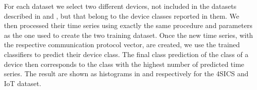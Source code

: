 For each dataset we select two different devices, not included in the datasets described in  and , but that belong to the device classes reported in them. We then processed their time series using exactly the same procedure and parameters as the one used to create the two training dataset. 
Once the new time series, with the respective communication protocol vector, are created, we use the trained classifiers to predict their device class. The final class prediction of the class of a device then corresponds to the class with the highest number of predicted time series. The result are shown as histograms in  and  respectively for the 4SICS and IoT dataset. 



\begin{figure}[h]
    \centering
    \begin{minipage}[c]{0.49\linewidth}
        \vspace{0pt}
        \centering
    \end{minipage}%
    \hfill%
    \begin{minipage}[c]{0.49\linewidth}
        \vspace{0pt}
        \centering

\end{minipage}
\end{figure}

